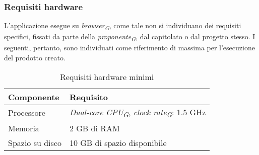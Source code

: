 \subsubsection{Requisiti hardware}
L’applicazione esegue su \textit{browser}\textsubscript{\textit{G}}, come tale non si individuano dei requisiti specifici, fissati da parte
della \textit{proponente}\textsubscript{\textit{G}}, dal capitolato o dal progetto stesso. I seguenti, pertanto, sono individuati come
riferimento di massima per l’esecuzione del prodotto creato.   
\begin{table}[H]
    \centering
    \begin{tabular}{ll}
        \toprule
        \textbf{Componente} & \textbf{Requisito} \\
        \midrule
        Processore & \textit{Dual-core CPU}\textsubscript{\textit{G}}, \textit{clock rate}\textsubscript{\textit{G}}: 1.5 GHz \\
        Memoria & 2 GB di RAM \\
        Spazio su disco & 10 GB di spazio disponibile\\
        \bottomrule
    \end{tabular}
    \caption{Requisiti hardware minimi}
\end{table} 